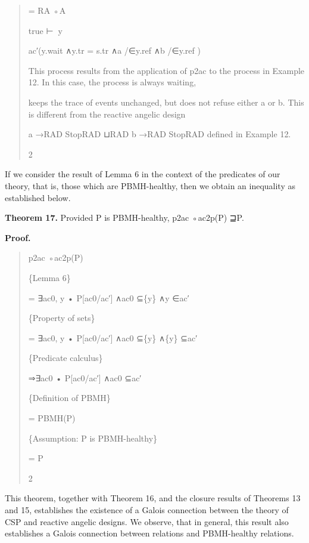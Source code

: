 \documentclass[11pt]{article}
\begin{document}
\begin{quote}\small\raggedright
= RA ◦A
\par
true ⊢∈⃝y
\par
ac′(y.wait ∧y.tr = s.tr ∧a /∈y.ref ∧b /∈y.ref )
\par
This process results from the application of p2ac to the process in Example 12. In this case, the process is always waiting,
\par
keeps the trace of events unchanged, but does not refuse either a or b. This is different from the reactive angelic design
\par
a →RAD StopRAD ⊔RAD b →RAD StopRAD defined in Example 12.
\par
2
\end{quote}

If we consider the result of Lemma 6 in the context of the predicates of our theory, that is, those which are PBMH-healthy, then we obtain an inequality as established below.

\noindent\textbf{Theorem 17.} Provided P is PBMH-healthy, p2ac ◦ac2p(P) ⊒P.


\noindent\textbf{Proof.}


\begin{quote}\small\raggedright
p2ac ◦ac2p(P)
\par
\{Lemma 6\}
\par
= ∃ac0, y • P[ac0/ac′] ∧ac0 ⊆\{y\} ∧y ∈ac′
\par
\{Property of sets\}
\par
= ∃ac0, y • P[ac0/ac′] ∧ac0 ⊆\{y\} ∧\{y\} ⊆ac′
\par
\{Predicate calculus\}
\par
⇒∃ac0 • P[ac0/ac′] ∧ac0 ⊆ac′
\par
\{Definition of PBMH\}
\par
= PBMH(P)
\par
\{Assumption: P is PBMH-healthy\}
\par
= P
\par
2
\end{quote}

This theorem, together with Theorem 16, and the closure results of Theorems 13 and 15, establishes the existence of a Galois connection between the theory of CSP and reactive angelic designs. We observe, that in general, this result also establishes a Galois connection between relations and PBMH-healthy relations.
\end{document}
